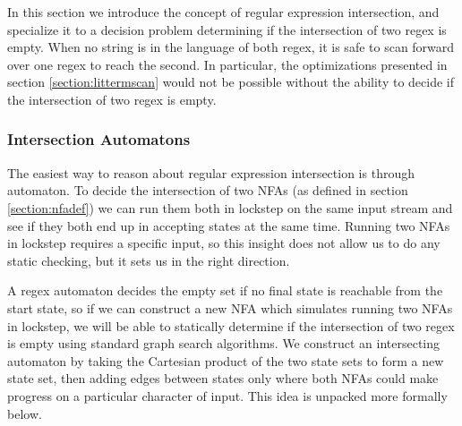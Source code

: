 In this section we introduce the concept of regular expression
intersection, and specialize it to a decision problem determining
if the intersection of two regex is empty.
When no string is in the language of both regex, it is
safe to scan forward over one regex to reach the second.
In particular, the optimizations presented in section
\ref{section:littermscan} would not be possible without
the ability to decide if the intersection of two regex is empty.

\subsubsection{Intersection Automatons}

The easiest way to reason about regular expression intersection
is through automaton. To decide the intersection of two NFAs
(as defined in section \ref{section:nfadef}) we
can run them both in lockstep on the same input stream
and see if they both end up in accepting states at the same time.
Running two NFAs in lockstep requires a specific input, so this insight
does not allow us to do any static checking, but it sets us in the
right direction.

A regex automaton decides the empty set if no final state is reachable
from the start state, so if we can construct a new NFA which simulates
running two NFAs in lockstep, we will be able to statically determine
if the intersection of two regex is empty using standard graph
search algorithms. We construct an
intersecting automaton by taking the Cartesian product
of the two state sets to form a new state set, then adding edges
between states only where both NFAs could make progress on a particular
character of input. This idea is unpacked more formally below.


